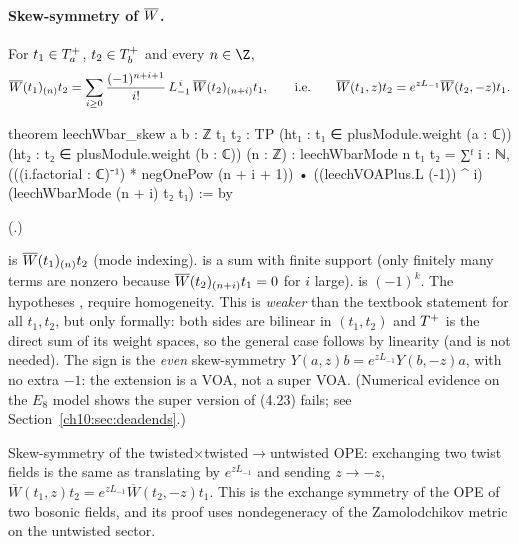 \paragraph{Skew-symmetry of $\overline{W}$.}
\begin{theorem}[DGM (4.9)]\label{ch10:thm:skew}
For $t_1\in T^{+}_a$, $t_2\in T^{+}_b$ and every $n\in\Z$,
\begin{equation*}
 \overline{W}(t_1)_{(n)}t_2=\sum_{i\ge0}\frac{(-1)^{n+i+1}}{i!}\,L_{-1}^{\,i}\,\overline{W}(t_2)_{(n+i)}t_1,
 \qquad\text{i.e.}\qquad \overline{W}(t_1,z)t_2=e^{zL_{-1}}\overline{W}(t_2,-z)t_1 .
\end{equation*}
\end{theorem}
\begin{leancode}
theorem leechWbar_skew {a b : ℤ} {t₁ t₂ : TP} (ht₁ : t₁ ∈ plusModule.weight (a : ℂ))
    (ht₂ : t₂ ∈ plusModule.weight (b : ℂ)) (n : ℤ) :
    leechWbarMode n t₁ t₂ = ∑ᶠ i : ℕ, (((i.factorial : ℂ)⁻¹) * negOnePow (n + i + 1)) •
      ((leechVOAPlus.L (-1)) ^ i) (leechWbarMode (n + i) t₂ t₁) := by
\end{leancode}
(.)
\begin{dictionary}
 is $\overline{W}(t_1)_{(n)}t_2$ (mode indexing).   is a sum
with finite support (only finitely many terms are nonzero because $\overline{W}(t_2)_{(n+i)}t_1=0$ for
$i$ large).   is $(-1)^k$.  The hypotheses ,  require
homogeneity.  This is \emph{weaker} than the textbook statement for all $t_1,t_2$, but only
formally: both sides are bilinear in $(t_1,t_2)$ and $T^{+}$ is the direct sum of its weight
spaces, so the general case follows by linearity (and is not needed).  The sign is the
\emph{even} skew-symmetry $Y(a,z)b=e^{zL_{-1}}Y(b,-z)a$, with no extra $-1$: the extension is a
VOA, not a super VOA.  (Numerical evidence on the $E_8$ model shows the super version of (4.23)
fails; see Section~\ref{ch10:sec:deadends}.)
\end{dictionary}

\begin{physics}
Skew-symmetry of the twisted$\times$twisted$\to$untwisted OPE: exchanging two twist fields is the same as translating by $e^{zL_{-1}}$ and sending $z\to-z$, $\overline W(t_1,z)t_2=e^{zL_{-1}}\overline W(t_2,-z)t_1$. This is the exchange symmetry of the OPE of two bosonic fields, and its proof uses nondegeneracy of the Zamolodchikov metric on the untwisted sector.
\end{physics}

